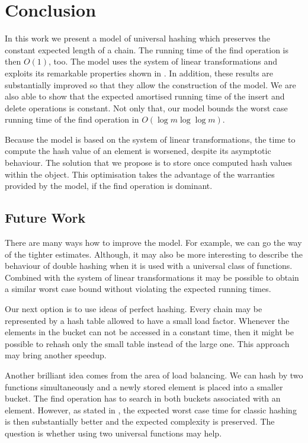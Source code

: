 \chapter{Conclusion}
In this work we present a model of universal hashing which preserves the constant expected length of a chain. The running time of the find operation is then $O(1)$, too. The model uses the system of linear transformations and exploits its remarkable properties shown in \cite{DBLP:journals/jacm/AlonDMPT99}. In addition, these results are substantially improved so that they allow the construction of the model. We are also able to show that the expected amortised running time of the insert and delete operations is constant. Not only that, our model bounds the worst case running time of the find operation in $O(\log m \log \log m)$. 

Because the model is based on the system of linear transformations, the time to compute the hash value of an element is worsened, despite its asymptotic behaviour. The solution that we propose is to store once computed hash values within the object. This optimisation takes the advantage of the warranties provided by the model, if the find operation is dominant. 

\section{Future Work}
There are many ways how to improve the model. For example, we can go the way of the tighter estimates. Although, it may also be more interesting to describe the behaviour of double hashing when it is used with a universal class of functions. Combined with the system of linear transformations it may be possible to obtain a similar worst case bound without violating the expected running times. 

Our next option is to use ideas of perfect hashing. Every chain may be represented by a hash table allowed to have a small load factor. Whenever the elements in the bucket can not be accessed in a constant time, then it might be possible to rehash only the small table instead of the large one. This approach may bring another speedup.

Another brilliant idea comes from the area of load balancing. We can hash by two functions simultaneously and a newly stored element is placed into a smaller bucket. The find operation has to search in both buckets associated with an element. However, as stated in \cite{1076315}, the expected worst case time for classic hashing is then substantially better and the expected complexity is preserved. The question is whether using two universal functions may help.

